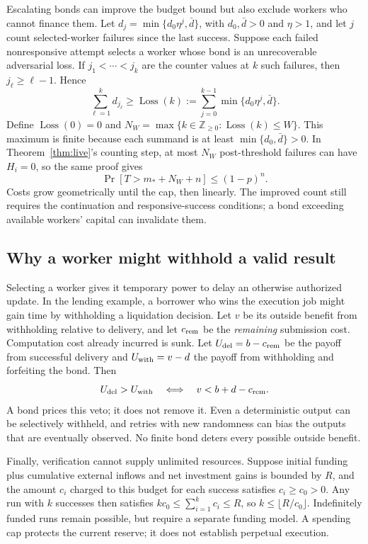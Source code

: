 \documentclass[10pt,letterpaper]{article}
\begin{document}
Escalating bonds can improve the budget bound but also exclude workers who cannot finance them. Let $d_j=\min\{d_0\eta^j,\bar d\}$, with $d_0,\bar d>0$ and $\eta>1$, and let $j$ count selected-worker failures since the last success. Suppose each failed nonresponsive attempt selects a worker whose bond is an unrecoverable adversarial loss. If $j_1<\cdots<j_k$ are the counter values at $k$ such failures, then $j_\ell\geq\ell-1$. Hence
\[
 \sum_{\ell=1}^{k}d_{j_\ell}
 \geq\operatorname{Loss}(k)
 :=\sum_{j=0}^{k-1}\min\{d_0\eta^j,\bar d\}.
\]
Define $\operatorname{Loss}(0)=0$ and $N_W=\max\{k\in\mathbb Z_{\geq0}:\operatorname{Loss}(k)\leq W\}$. This maximum is finite because each summand is at least $\min\{d_0,\bar d\}>0$. In Theorem~\ref{thm:live}'s counting step, at most $N_W$ post-threshold failures can have $H_i=0$, so the same proof gives
\[
 \Pr[T>m_*+N_W+n]\leq(1-p)^n.
\]
Costs grow geometrically until the cap, then linearly. The improved count still requires the continuation and responsive-success conditions; a bond exceeding available workers' capital can invalidate them.

\subsection{Why a worker might withhold a valid result}
Selecting a worker gives it temporary power to delay an otherwise authorized update. In the lending example, a borrower who wins the execution job might gain time by withholding a liquidation decision. Let $v$ be its outside benefit from withholding relative to delivery, and let $c_{\rm rem}$ be the \emph{remaining} submission cost. Computation cost already incurred is sunk. Let $U_{\rm del}=b-c_{\rm rem}$ be the payoff from successful delivery and $U_{\rm with}=v-d$ the payoff from withholding and forfeiting the bond. Then
\begin{equation}
 U_{\rm del}>U_{\rm with}\quad\Longleftrightarrow\quad
 v<b+d-c_{\rm rem}. \label{eq:veto}
\end{equation}
A bond prices this veto; it does not remove it. Even a deterministic output can be selectively withheld, and retries with new randomness can bias the outputs that are eventually observed. No finite bond deters every possible outside benefit.

Finally, verification cannot supply unlimited resources. Suppose initial funding plus cumulative external inflows and net investment gains is bounded by $R$, and the amount $c_i$ charged to this budget for each success satisfies $c_i\geq c_0>0$. Any run with $k$ successes then satisfies $kc_0\leq\sum_{i=1}^k c_i\leq R$, so $k\leq\lfloor R/c_0\rfloor$. Indefinitely funded runs remain possible, but require a separate funding model. A spending cap protects the current reserve; it does not establish perpetual execution.
\end{document}
